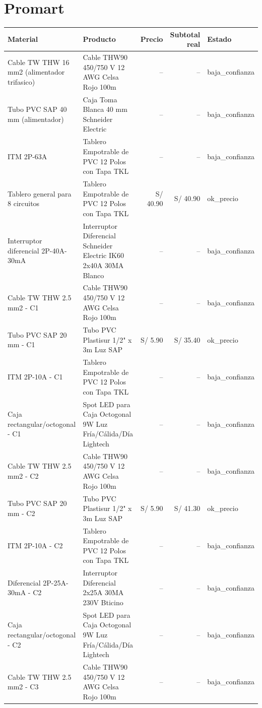 \documentclass[11pt,a4paper]{article}
\begin{document}
\section{Promart}
\begin{longtable}{p{} p{} r r p{}}
\toprule Material & Producto & Precio & Subtotal real & Estado \\ \midrule\endhead
Cable TW THW 16 mm2 (alimentador trifasico) & Cable THW90 450/750 V 12 AWG Celsa Rojo 100m & -- & -- & baja\_confianza \\
Tubo PVC SAP 40 mm (alimentador) & Caja Toma Blanca 40 mm Schneider Electric & -- & -- & baja\_confianza \\
ITM 2P-63A & Tablero Empotrable de PVC 12 Polos con Tapa TKL & -- & -- & baja\_confianza \\
Tablero general para 8 circuitos & Tablero Empotrable de PVC 12 Polos con Tapa TKL & S/ 40.90 & S/ 40.90 & ok\_precio \\
Interruptor diferencial 2P-40A-30mA & Interruptor Diferencial Schneider Electric IK60 2x40A 30MA Blanco & -- & -- & baja\_confianza \\
Cable TW THW 2.5 mm2 - C1 & Cable THW90 450/750 V 12 AWG Celsa Rojo 100m & -- & -- & baja\_confianza \\
Tubo PVC SAP 20 mm - C1 & Tubo PVC Plastisur 1/2" x 3m Luz SAP & S/ 5.90 & S/ 35.40 & ok\_precio \\
ITM 2P-10A - C1 & Tablero Empotrable de PVC 12 Polos con Tapa TKL & -- & -- & baja\_confianza \\
Caja rectangular/octogonal - C1 & Spot LED para Caja Octogonal 9W Luz Fría/Cálida/Día Lightech & -- & -- & baja\_confianza \\
Cable TW THW 2.5 mm2 - C2 & Cable THW90 450/750 V 12 AWG Celsa Rojo 100m & -- & -- & baja\_confianza \\
Tubo PVC SAP 20 mm - C2 & Tubo PVC Plastisur 1/2" x 3m Luz SAP & S/ 5.90 & S/ 41.30 & ok\_precio \\
ITM 2P-10A - C2 & Tablero Empotrable de PVC 12 Polos con Tapa TKL & -- & -- & baja\_confianza \\
Diferencial 2P-25A-30mA - C2 & Interruptor Diferencial 2x25A 30MA 230V Bticino & -- & -- & baja\_confianza \\
Caja rectangular/octogonal - C2 & Spot LED para Caja Octogonal 9W Luz Fría/Cálida/Día Lightech & -- & -- & baja\_confianza \\
Cable TW THW 2.5 mm2 - C3 & Cable THW90 450/750 V 12 AWG Celsa Rojo 100m & -- & -- & baja\_confianza \\

\end{longtable}
\end{document}
